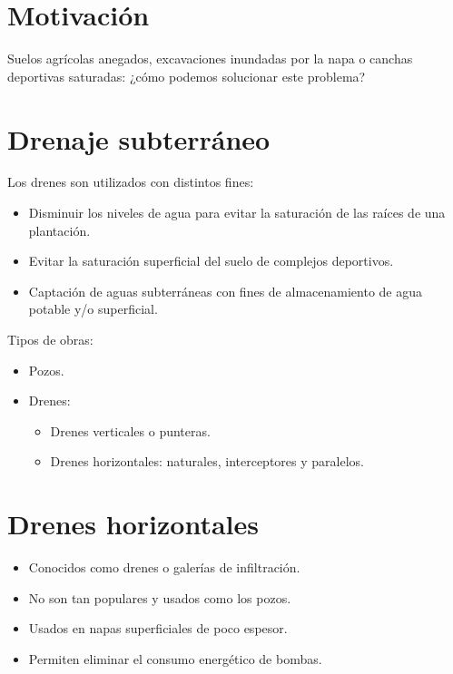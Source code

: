 
\section{Motivación}
Suelos agrícolas anegados, excavaciones inundadas por la napa o canchas
deportivas saturadas: ¿cómo podemos solucionar este problema?

\section{Drenaje subterráneo}
Los drenes son utilizados con distintos fines:
\begin{itemize}
  \item Disminuir los niveles de agua para evitar la saturación de las raíces
        de una plantación.
  \item Evitar la saturación superficial del suelo de complejos deportivos.
  \item Captación de aguas subterráneas con fines de almacenamiento de agua
        potable y/o superficial.
\end{itemize}
Tipos de obras:
\begin{itemize}
  \item Pozos.
  \item Drenes:
  \begin{itemize}
    \item Drenes verticales o punteras.
    \item Drenes horizontales: naturales, interceptores y paralelos.
  \end{itemize}
\end{itemize}

\section{Drenes horizontales}
\begin{itemize}
  \item Conocidos como drenes o galerías de infiltración.
  \item No son tan populares y usados como los pozos.
  \item Usados en napas superficiales de poco espesor.
  \item Permiten eliminar el consumo energético de bombas.
\end{itemize}

